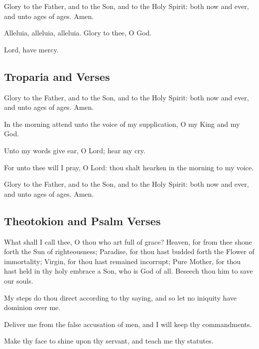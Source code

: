 Glory to the Father, and to the Son, and to the Holy Spirit: both now and ever, and unto ages of ages. Amen.

Alleluia, alleluia, alleluia. Glory to thee, O God. 

Lord, have mercy. 

\subsection{Troparia and Verses}


Glory to the Father, and to the Son, and to the Holy Spirit: both now and ever, and unto ages of ages. Amen.

In the morning attend unto the voice of my supplication, O my King and my God. 

 Unto my words give ear, O Lord; hear my cry. 

 For unto thee will I pray, O Lord: thou shalt hearken in the morning to my voice. 

Glory to the Father, and to the Son, and to the Holy Spirit: both now and ever, and unto ages of ages. Amen.

\subsection{Theotokion and Psalm Verses}

What shall I call thee, O thou who art full of grace? Heaven, for from thee shone forth the Sun of righteousness; Paradise, for thou hast budded forth the Flower of immortality; Virgin, for thou hast remained incorrupt; Pure Mother, for thou hast held in thy holy embrace a Son, who is God of all. Beseech thou him to save our souls.

My steps do thou direct according to thy saying, and so let no iniquity have dominion over me. 

Deliver me from the false accusation of men, and I will keep thy commandments. 

Make thy face to shine upon thy servant, and teach me thy statutes. 

